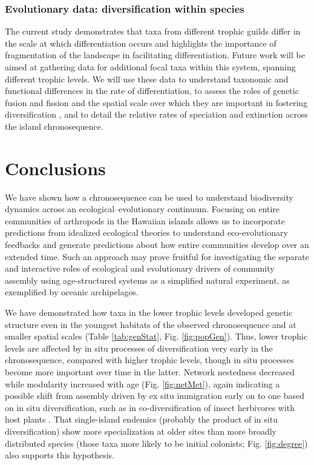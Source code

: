 \subsubsection{Evolutionary data: diversification within species} The
current study demonstrates that taxa from different trophic guilds
differ in the scale at which differentiation occurs and highlights the
importance of fragmentation of the landscape in facilitating
differentiation. Future work will be aimed at gathering data for
additional focal taxa within this system, spanning different trophic
levels. We will use these data to understand taxonomic and functional
differences in the rate of differentiation, to assess the roles of
genetic fusion and fission and the spatial scale over which they are
important in fostering diversification \citep{gillespie2014}, and to
detail the relative rates of speciation and extinction across the
island chronosequence.


\section{Conclusions}

We have shown how a chronosequence can be used to understand
biodiversity dynamics across an ecological–evolutionary
continuum. Focusing on entire communities of arthropods in the
Hawaiian islands allows us to incorporate predictions from idealized
ecological theories to understand eco-evolutionary feedbacks and
generate predictions about how entire communities develop over an
extended time. Such an approach may prove fruitful for investigating
the separate and interactive roles of ecological and evolutionary
drivers of community assembly using age-structured systems as a
simplified natural experiment, as exemplified by oceanic archipelagos.

We have demonstrated how taxa in the lower trophic levels developed
genetic structure even in the youngest habitats of the observed
chronosequence and at smaller spatial scales (Table \ref{tab:genStat},
Fig. \ref{fig:popGen}). Thus, lower trophic levels are affected by in
situ processes of diversification very early in the chronosequence,
compared with higher trophic levels, though in situ processes become
more important over time in the latter. Network nestedness decreased
while modularity increased with age (Fig. \ref{fig:netMet}), again
indicating a possible shift from assembly driven by ex situ
immigration early on to one based on in situ diversification, such as
in co-diversification of insect herbivores with host plants
\citep{bascompte2007, donatti2011}. That single-island endemics
(probably the product of in situ diversification) show more
specialization at older sites than more broadly distributed species
(those taxa more likely to be initial colonists;
Fig. \ref{fig:degree}) also supports this hypothesis.

